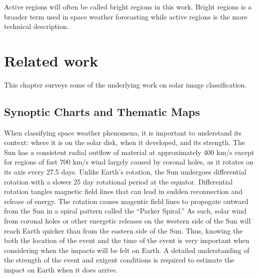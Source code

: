 \documentclass[twoside]{report}
\begin{document}
Active regions will often be called bright regions in this work. Bright regions is a broader term used in space weather forecasting while active regions is the more technical description. 

\chapter{Related work} \label{ch:relatedwork}
This chapter surveys some of the underlying work on solar image classification. 

\section{Synoptic Charts and Thematic Maps}
When classifying space weather phenomena, it is important to understand its context: where it is on the solar disk, when it developed, and its strength. The Sun has a consistent radial outflow of material at approximately 400 km/s except for regions of fast 700 km/s wind largely caused by coronal holes, as it rotates on its axis every 27.5 days. Unlike Earth's rotation, the Sun undergoes differential rotation with a slower 25 day rotational period at the equator. Differential rotation tangles magnetic field lines that can lead in sudden reconnection and release of energy. The rotation causes magentic field lines to propogate outward from the Sun in a spiral pattern called the ``Parker Spiral.'' As such, solar wind from coronal holes or other energetic releases on the western side of the Sun will reach Earth quicker than from the eastern side of the Sun. Thus, knowing the both the location of the event and the time of the event is very important when considering when the impacts will be felt on Earth. A detailed understanding of the strength of the event and exigent conditions is required to estimate the impact on Earth when it does arrive.
\end{document}
